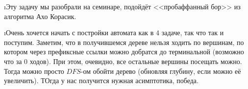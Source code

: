 \i Эту задачу мы разобрали на семинаре, подойдёт <<пробаффанный бор>> из алгоритма Ахо Корасик. 

\i Очень хочется начать с постройки автомата как в 4 задаче, так что так и поступим. Заметим, что в получившемся дереве нельзя ходить по вершинам, по котором через 
префиксные ссылки можно добратся до терминальной (возможно что за 0 ходов). При этом, очевидно, все остальные вершины посещать можно. Тогда можно просто $DFS$-ом 
обойти дерево (обновляя глубину, если можно её увеличить). ТОгда у нас получится нужная асимптотика, победа. 
